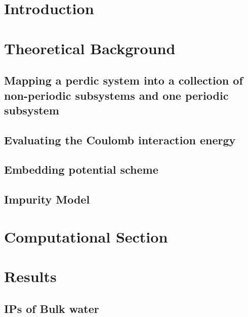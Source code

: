 \documentclass[12pt,a4paper]{article}
\begin{document}
\section{Introduction}
\section{Theoretical Background}
\subsection{Mapping a perdic system into a collection of non-periodic subsystems and one periodic subsystem}
\subsection{Evaluating the Coulomb interaction energy}
\subsection{Embedding potential scheme}
\subsection{Impurity Model}
\section{Computational Section}

\section{Results}
\subsection{IPs of Bulk water}
\end{document}
